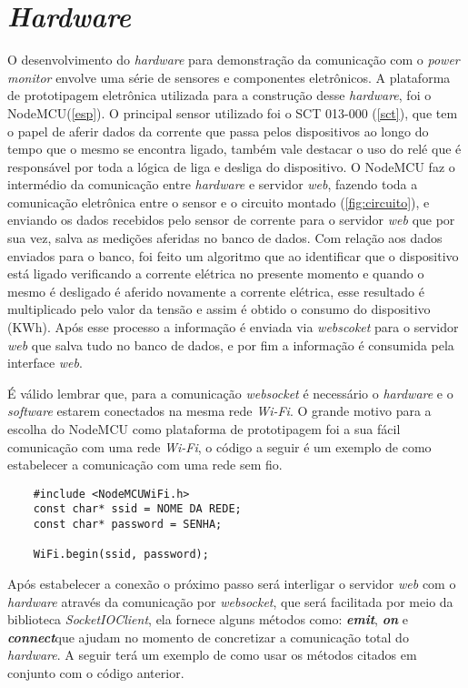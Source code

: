 \section[\textit{Hardware}]{\textit{Hardware}}\label{hard-sec}
O desenvolvimento do \textit{hardware} para demonstração da comunicação com o \textit{power monitor} envolve uma série de sensores e componentes
eletrônicos. A plataforma de prototipagem eletrônica utilizada para a construção desse \textit{hardware}, foi o NodeMCU(\autoref{esp}). O principal sensor
utilizado foi o SCT 013-000 (\autoref{sct}), que tem o papel de aferir dados da corrente que passa pelos dispositivos ao longo do tempo que o mesmo se encontra
ligado, também vale destacar o uso do relé que é responsável por toda a lógica de liga e desliga do dispositivo. O NodeMCU faz o intermédio da comunicação entre 
\textit{hardware} e servidor \textit{web}, fazendo toda a comunicação eletrônica entre o sensor e o circuito montado (\autoref{fig:circuito}), e enviando os dados
recebidos pelo sensor de corrente para o servidor \textit{web} que por sua vez, salva as medições aferidas no banco de dados. Com relação aos dados enviados 
para o banco, foi feito um algoritmo que ao identificar que o dispositivo está ligado verificando a corrente elétrica no presente momento e quando o mesmo é desligado 
é aferido novamente a corrente elétrica, esse resultado é multiplicado pelo valor da tensão
e assim é obtido o consumo do dispositivo (KWh). Após esse processo a informação é enviada via \textit{webscoket} 
para o servidor \textit{web} que salva tudo no banco de dados, e por fim a informação é consumida pela interface \textit{web}.

É válido lembrar que, para a comunicação \textit{websocket} é necessário o \textit{hardware} e o \textit{software} estarem conectados
na mesma rede \textit{Wi-Fi}. O grande motivo para a escolha do NodeMCU como plataforma de prototipagem foi a sua fácil comunicação com uma rede
\textit{Wi-Fi}, o código a seguir é um exemplo de como estabelecer a comunicação com uma rede sem fio.

\newpage

\begin{lstlisting}
	#include <NodeMCUWiFi.h>
	const char* ssid = NOME DA REDE;
	const char* password = SENHA;
	
	WiFi.begin(ssid, password);
\end{lstlisting}

Após estabelecer a conexão o próximo passo será interligar o servidor \textit{web} com o \textit{hardware} através da comunicação por \textit{websocket},
que será facilitada por meio da biblioteca \textit{SocketIOClient}, ela fornece alguns métodos como: \textit{\textbf{emit}}\protect\footnotemark, \textit{\textbf{on}}\protect\footnotemark 
e \textit{\textbf{connect}}\protect\footnotemark  que ajudam no momento de concretizar a comunicação total do \textit{hardware}. A seguir terá um
exemplo de como usar os métodos citados em conjunto com o código anterior.

